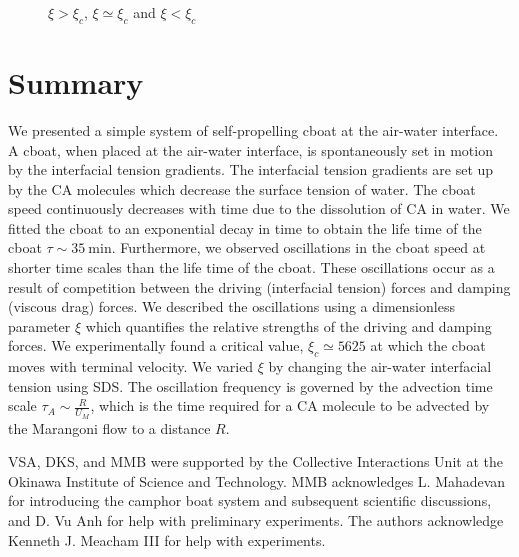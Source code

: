 \documentclass[journal=langd5, manuscript=article, layout=onecolumn]{achemso}
\begin{document}
\begin{figure}[ht]
\begin{minipage}[t]{0.3\linewidth}
	\end{minipage}
	\caption{$\xi > \xi_{c}$, $\xi \simeq \xi_{c}$ and $\xi < \xi_{c}$}\label{fig:uvst_sigma}
\end{figure}
\section{Summary}
\label{sec:summary}
We presented a simple system of self-propelling cboat at the air-water interface. A cboat, when placed at the air-water interface, is spontaneously set in motion by the interfacial tension gradients. The interfacial tension gradients are set up by the CA molecules which decrease the surface tension of water. The cboat speed continuously decreases with time due to the dissolution of CA in water. We fitted the cboat to an exponential decay in time to obtain the life time of the cboat $\tau \sim 35\ \mathrm{min}$. Furthermore, we observed oscillations in the cboat speed at shorter time scales than the life time of the cboat. These oscillations occur as a result of competition between the driving (interfacial tension) forces and damping (viscous drag) forces. We described the oscillations using a dimensionless parameter $\xi$ which quantifies the relative strengths of the driving and damping forces. We experimentally found a critical value, $\xi_{c} \simeq 5625$ at which the cboat moves with terminal velocity. We varied $\xi$ by changing the air-water interfacial tension using SDS. The oscillation frequency is governed by the advection time scale $\tau_{A} \sim \frac{R}{U_{M}}$, which is the time required for a CA molecule to be advected by the Marangoni flow to a distance $R$.

\begin{acknowledgement}
VSA, DKS, and MMB were supported by the Collective Interactions Unit at the Okinawa Institute of Science and Technology. MMB acknowledges L. Mahadevan for introducing the camphor boat system and subsequent scientific discussions, and D. Vu Anh for help with preliminary experiments. The authors acknowledge Kenneth J. Meacham III for help with experiments.
\end{acknowledgement}






\end{document}
